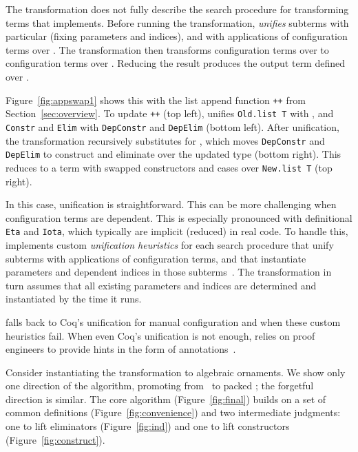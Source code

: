 The transformation does not fully describe the search procedure for transforming terms that \toolnamec implements.
Before running the transformation, \toolnamec \textit{unifies} subterms with particular \Aa (fixing parameters and indices),
and with applications of configuration terms over \Aa. 
The transformation then transforms configuration terms over \Aa
to configuration terms over \B.
Reducing the result produces the output term defined over \B.

Figure~\ref{fig:appswap1} shows this with the list append function \lstinline{++} from Section~\ref{sec:overview}.
To update \lstinline{++} (top left), \toolnamec unifies \lstinline{Old.list T} with \Aa, and \lstinline{Constr} and \lstinline{Elim}
with \lstinline{DepConstr} and \lstinline{DepElim} (bottom left).
After unification, the transformation recursively substitutes \B
for \Aa, which moves \lstinline{DepConstr} and \lstinline{DepElim}
to construct and eliminate over the updated type (bottom right).
This reduces to a term with swapped constructors and cases over \lstinline{New.list T} (top right).

In this case, unification is straightforward.
This can be more challenging when configuration terms are dependent.
This is especially pronounced with definitional \lstinline{Eta} and \lstinline{Iota},
which typically are implicit (reduced) in real code.
To handle this, \toolnamec implements custom \textit{unification heuristics} for each search procedure
that unify subterms with applications of configuration terms, and that instantiate parameters and dependent indices in those subterms~\href{https://github.com/uwplse/pumpkin-pi/blob/v2.0.0/plugin/src/automation/lift/liftconfig.ml}{}. %
The transformation in turn assumes that all existing parameters and indices are determined and instantiated
by the time it runs.

\toolnamec falls back to Coq's unification for manual configuration and when these custom heuristics fail.
When even Coq's unification is not enough, \toolnamec relies on proof engineers to provide hints
in the form of annotations~\href{https://github.com/uwplse/pumpkin-pi/blob/v2.0.0/plugin/coq/nonorn.v}{}.

Consider instantiating the transformation to algebraic ornaments.
We show only one direction of the algorithm, promoting 
from \Aa\ to packed \B; the forgetful direction is similar.
The core algorithm (Figure~\ref{fig:final}) builds on a set of common definitions (Figure~\ref{fig:convenience}) and 
two intermediate judgments: one to lift eliminators (Figure~\ref{fig:ind}) and one to lift constructors (Figure~\ref{fig:construct}).

